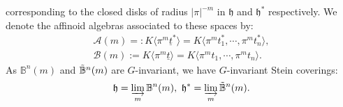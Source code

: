 \documentclass{amsart}
\begin{document}
corresponding to the closed disks of radius $\vert \pi\vert^{-m}$ in $\mathfrak{h}$ and $\mathfrak{h}^*$ respectively. We denote the affinoid algebras associated to these spaces by:
\begin{multline*}
    \mathscr{A}(m)=:K\langle \pi^m\underline{t}^* \rangle=K\langle \pi^mt^*_1,\cdots,\pi^mt^*_n\rangle,\\ \mathscr{B}(m):=K\langle \pi^m\underline{t} \rangle=K\langle \pi^mt_1,\cdots,\pi^mt_n\rangle.
\end{multline*}
As $\mathbb{B}^n(m)$ and $\Tilde{\mathbb{B}}^n(m)$ are $G$-invariant, we have $G$-invariant Stein coverings:
\begin{equation*}
    \mathfrak{h}=\varinjlim_m \mathbb{B}^n(m), \textnormal{ } \mathfrak{h}^{*}=\varinjlim_m \Tilde{\mathbb{B}}^n(m).
\end{equation*}
\end{document}
